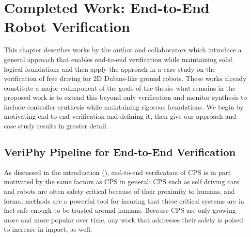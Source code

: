 \documentclass[12pt]{cmuthesis}
\theoremstyle{definition}
\theoremstyle{remark}
\newcommand{\rref}[2][]{\prettyref{#2}}
\newcommand{\VeriPhy}{VeriPhy\xspace}
\begin{document}
\chapter{Completed Work:  End-to-End Robot Verification}
\label{ch:end-to-end-v}
This chapter describes  works by the author and collaborators which introduce a general approach that enables end-to-end verification while maintaining solid logical foundations and then apply the approach in a case study on the verification of free driving for 2D Dubins-like ground robots.
These works already constitute a major cohmponent of the goals of the thesis: what remains in the proposed work is to extend this beyond only verification and monitor synthesis to include controller synthesis while maintaining rigorous foundations.
We begin by motivating end-to-end verification and defining it, then give our approach and case study results in greater detail.

\section{\VeriPhy Pipeline for End-to-End Verification}
\label{sec:veriphy}
As discussed in the introduction (\rref{ch:introduction}), end-to-end verification of CPS is in part motivated by the same factors as CPS in general: CPS such as self driving cars and robots are often safety critical because of their proximity to humans, and formal methods are a powerful tool for insuring that these critical systems are in fact safe enough to be trusted around humans. Because CPS are only growing more and more popular over time, any work that addresses their safety is poised to increase in impact, as well.
\end{document}
